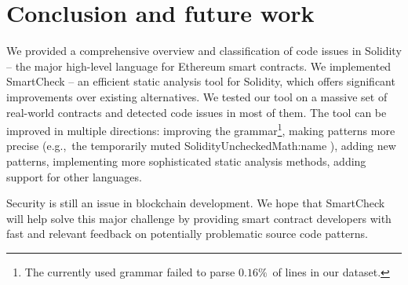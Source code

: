 \section{Conclusion and future work}
	
We provided a comprehensive overview and classification of code issues in Solidity -- the major high-level language for Ethereum smart contracts.
We implemented SmartCheck -- an efficient static analysis tool for Solidity, which offers significant improvements over existing alternatives.
We tested our tool on a massive set of real-world contracts and detected code issues in most of them.
The tool can be improved in multiple directions: improving the grammar\footnote{The currently used grammar failed to parse $0.16\%$~of lines in our dataset.}, making patterns more precise (e.g.,~the temporarily muted {\usevalue SolidityUncheckedMath:name }), adding new patterns, implementing more sophisticated static analysis methods, adding support for other languages.

Security is still an issue in blockchain development.
We hope that SmartCheck will help solve this major challenge by providing smart contract developers with fast and relevant feedback on potentially problematic source code patterns.